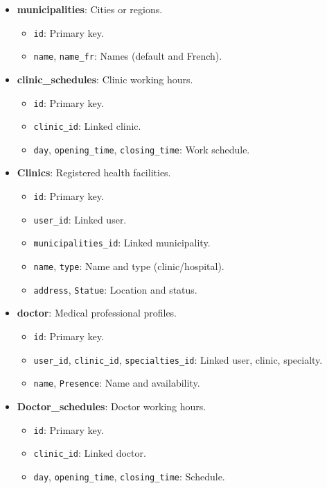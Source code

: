 \documentclass[12pt]{report}
\begin{document}
\begin{itemize}
	\item \textbf{municipalities}: Cities or regions.
	      \begin{itemize}
		      \item \texttt{id}: Primary key.
		      \item \texttt{name}, \texttt{name\_fr}: Names (default and French).
	      \end{itemize}

	\item \textbf{clinic\_schedules}: Clinic working hours.
	      \begin{itemize}
		      \item \texttt{id}: Primary key.
		      \item \texttt{clinic\_id}: Linked clinic.
		      \item \texttt{day}, \texttt{opening\_time}, \texttt{closing\_time}: Work schedule.
	      \end{itemize}

	\item \textbf{Clinics}: Registered health facilities.
	      \begin{itemize}
		      \item \texttt{id}: Primary key.
		      \item \texttt{user\_id}: Linked user.
		      \item \texttt{municipalities\_id}: Linked municipality.
		      \item \texttt{name}, \texttt{type}: Name and type (clinic/hospital).
		      \item \texttt{address}, \texttt{Statue}: Location and status.
	      \end{itemize}

	\item \textbf{doctor}: Medical professional profiles.
	      \begin{itemize}
		      \item \texttt{id}: Primary key.
		      \item \texttt{user\_id}, \texttt{clinic\_id}, \texttt{specialties\_id}: Linked user, clinic, specialty.
		      \item \texttt{name}, \texttt{Presence}: Name and availability.
	      \end{itemize}

	\item \textbf{Doctor\_schedules}: Doctor working hours.
	      \begin{itemize}
		      \item \texttt{id}: Primary key.
		      \item \texttt{clinic\_id}: Linked doctor.
		      \item \texttt{day}, \texttt{opening\_time}, \texttt{closing\_time}: Schedule.
	      \end{itemize}


\end{itemize}
\end{document}
